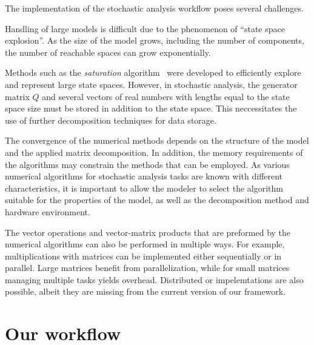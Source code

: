 The implementation of the stochastic analysis workflow poses several
challenges.

Handling of large models is difficult due to the phenomenon of
\enquote{state space explosion}. As the size of the model grows,
including the number of components, the number of reachable spaces can
grow exponentially.

Methods such as the \emph{saturation} algorithm~\citep{Ciardo:2006}
were developed to efficiently explore and represent large state
spaces. However, in stochastic analysis, the generator matrix $Q$ and
several vectors of real numbers with lengths equal to the state space
size must be stored in addition to the state space. This neccessitates
the use of further decomposition techniques for data storage.

The convergence of the numerical methods depends on the structure of
the model and the applied matrix decomposition. In addition, the memory
requirements of the algorithms may constrain the methods that can be
employed. As various numerical algorithms for stochastic analysis
tasks are known with different characteristics, it is important to
allow the modeler to select the algorithm suitable for the properties
of the model, as well as the decomposition method and hardware environment.

The vector operations and vector-matrix products that are preformed by
the numerical algorithms can also be performed in multiple ways. For
example, multiplications with matrices can be implemented either
sequentially or in parallel. Large matrices benefit from
parallelization, while for small matrices managing
multiple tasks yields overhead. Distributed or 
impelemtations are also possible, albeit they are missing from the
current version of our framework.

\section{Our workflow}
  \label{chap:overview:sec:our-workflow}

